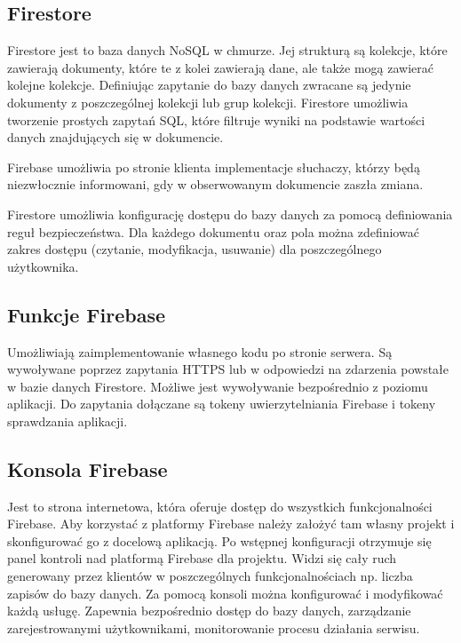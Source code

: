 \subsection{Firestore}

Firestore jest to baza danych NoSQL w chmurze. Jej strukturą są kolekcje, które zawierają dokumenty, które te z kolei zawierają dane, ale także mogą zawierać kolejne kolekcje. Definiując zapytanie do bazy danych zwracane są jedynie dokumenty z poszczególnej kolekcji lub grup kolekcji. Firestore umożliwia tworzenie prostych zapytań SQL, które filtruje wyniki na podstawie wartości danych znajdujących się w dokumencie. 

Firebase umożliwia po stronie klienta implementacje słuchaczy, którzy będą niezwłocznie informowani, gdy w obserwowanym dokumencie zaszła zmiana. 

Firestore umożliwia konfigurację dostępu do bazy danych za pomocą definiowania reguł bezpieczeństwa. Dla każdego dokumentu oraz pola można zdefiniować zakres dostępu (czytanie, modyfikacja, usuwanie) dla poszczególnego użytkownika.


\subsection{Funkcje Firebase}

Umożliwiają zaimplementowanie własnego kodu po stronie serwera. Są wywoływane poprzez zapytania HTTPS lub w odpowiedzi na zdarzenia powstałe w bazie danych Firestore. 
Możliwe jest wywoływanie bezpośrednio z poziomu aplikacji. Do zapytania dołączane są tokeny uwierzytelniania Firebase i tokeny sprawdzania aplikacji.

\subsection{Konsola Firebase}

Jest to strona internetowa, która oferuje dostęp do wszystkich funkcjonalności Firebase. Aby korzystać z platformy Firebase należy założyć tam własny projekt i skonfigurować go z docelową aplikacją. Po wstępnej konfiguracji otrzymuje się panel kontroli nad platformą Firebase dla projektu. Widzi się cały ruch generowany przez klientów w poszczególnych funkcjonalnościach np. liczba zapisów do bazy danych. Za pomocą konsoli można konfigurować i modyfikować każdą usługę. Zapewnia bezpośrednio dostęp do bazy danych, zarządzanie zarejestrowanymi użytkownikami, monitorowanie procesu działania serwisu. 

